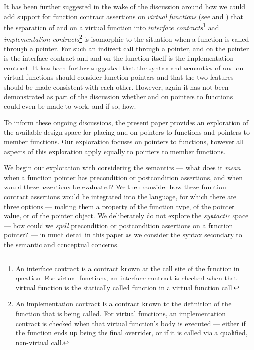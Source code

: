 It has been further suggested in the wake of the discussion around how we could add support for function contract assertions on \emph{virtual functions} (see \cite{P3097R0} and \cite{P3165R0}) that the separation of  and  on a virtual function into \emph{interface contracts}\footnote{An interface contract is a contract known at the call site of the function in question. For virtual functions, an interface contract is checked when that virtual function is the statically called function in a virtual function call.} and \emph{implementation contracts}\footnote{An implementation contract is a contract known to the definition of the function that is being called. For virtual functions, an implementation contract is checked when that virtual function's body is executed --- either if the function ends up being the final overrider, or if it is called via a qualified, non-virtual call.} is isomorphic to the situation when a function is called through a pointer. For such an indirect call through a pointer,  and  on the pointer is the interface contract and  and  on the function itself is the implementation contract. It has been further suggested that the syntax and semantics of  and  on virtual functions should consider function pointers and that the two features should be made consistent with each other. However, again it has not been demonstrated as part of the discussion whether  and  on pointers to functions could even be made to work, and if so, how.


To inform these ongoing discussions, the present paper provides an exploration of the available design space for placing  and  on pointers to functions and pointers to member functions. Our exploration focuses on pointers to functions, however all aspects of this exploration apply equally to pointers to member functions.

We begin our exploration with considering the semantics --- what does it \emph{mean} when a function pointer has precondition or postcondition assertions, and when would these assertions be evaluated? We then consider how these function contract assertions would be integrated into the language, for which there are three options --- making them a property of the function type, of the pointer value, or of the pointer object. We deliberately do not explore the \emph{syntactic} space --- how could we \emph{spell} precondition or postcondition assertions on a function pointer? --- in much detail in this paper as we consider the syntax secondary to the semantic and conceptual concerns. 

